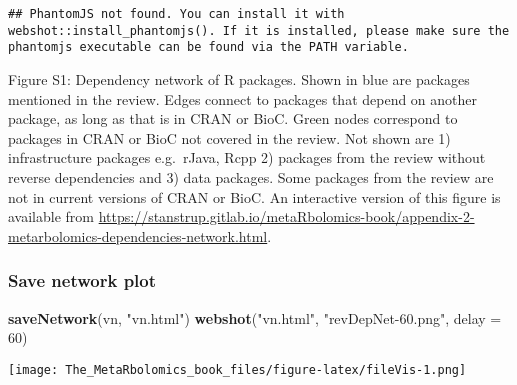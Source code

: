 \documentclass[]{article}
\newenvironment{Shaded}{\begin{snugshade}}{\end{snugshade}}
\newcommand{\DataTypeTok}[1]{\textcolor[rgb]{0.13,0.29,0.53}{#1}}
\newcommand{\DecValTok}[1]{\textcolor[rgb]{0.00,0.00,0.81}{#1}}
\newcommand{\KeywordTok}[1]{\textcolor[rgb]{0.13,0.29,0.53}{\textbf{#1}}}
\newcommand{\NormalTok}[1]{#1}
\newcommand{\StringTok}[1]{\textcolor[rgb]{0.31,0.60,0.02}{#1}}
\begin{document}
\begin{verbatim}
## PhantomJS not found. You can install it with webshot::install_phantomjs(). If it is installed, please make sure the phantomjs executable can be found via the PATH variable.
\end{verbatim}

\hypertarget{htmlwidget-8fcd12b88d921bc648e0}{}

Figure S1: Dependency network of R packages. Shown in blue are packages mentioned in the review. Edges connect to packages that depend on another package, as long as that is in CRAN or BioC. Green nodes correspond to packages in CRAN or BioC not covered in the review. Not shown are 1) infrastructure packages e.g.~rJava, Rcpp 2) packages from the review without reverse dependencies and 3) data packages. Some packages from the review are not in current versions of CRAN or BioC. An interactive version of this figure is available from \href{appendix-2-metarbolomics-dependencies-network.html}{https://stanstrup.gitlab.io/metaRbolomics-book/appendix-2-metarbolomics-dependencies-network.html}.

\hypertarget{save-network-plot}{%
\subsubsection*{Save network plot}\label{save-network-plot}}

\begin{Shaded}
\begin{Highlighting}[]
\KeywordTok{saveNetwork}\NormalTok{(vn, }\StringTok{"vn.html"}\NormalTok{)}
\KeywordTok{webshot}\NormalTok{(}\StringTok{"vn.html"}\NormalTok{, }\StringTok{"revDepNet-60.png"}\NormalTok{, }\DataTypeTok{delay =} \DecValTok{60}\NormalTok{)}
\end{Highlighting}
\end{Shaded}

\texttt{[image: The\_MetaRbolomics\_book\_files/figure-latex/fileVis-1.png]}
\end{document}
